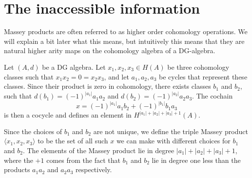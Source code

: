 

\section{The inaccessible information}

Massey products are often referred to as higher order cohomology operations. We will explain a bit later what this means, but intuitively this means that they are natural higher arity maps on the cohomology algebra of a DG-algebra. 

\begin{definition}
Let $(A,d)$ be a DG algebra. Let $x_1, x_2, x_3 \in H(A)$ be three cohomology classes such that $x_1 x_2 = 0 = x_2 x_3$, and let $a_1, a_2, a_3$ be cycles that represent these classes. Since their product is zero in cohomology, there exists classes $b_1$ and $b_2$, such that $d(b_1)=(-1)^{|a_1|}a_1a_2$ and $d(b_2)=(-1)^{|a_2|}a_2a_3$. The cochain 
\begin{equation*}
    x = (-1)^{|a_1|}a_1 b_2 + (-1)^{|b_1|}b_1 a_3
\end{equation*}
is then a cocycle and defines an element in $H^{|a_1|+|a_2|+|a_3|+1}(A)$.  

Since the choices of $b_1$ and $b_2$ are not unique, we define the triple Massey product $\langle x_1, x_2, x_3 \rangle$ to be the set of all such $x$ we can make with different choices for $b_1$ and $b_2$. The elements of the Massey product lie in degree $|a_1|+|a_2|+|a_3|+1$, where the $+1$ comes from the fact that $b_1$ and $b_2$ lie in degree one less than the products $a_1 a_2$ and $a_2 a_3$ respectively. 
\end{definition} 

